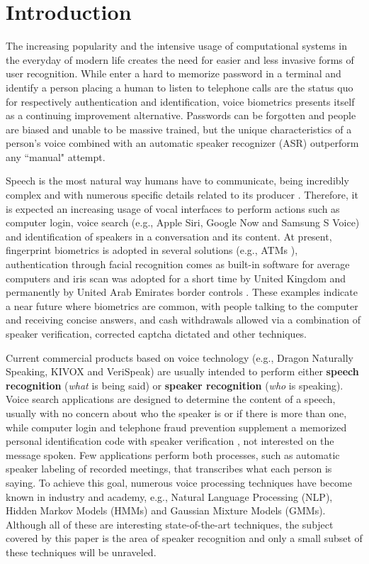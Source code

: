 \chapter{Introduction}
\label{ch:intro}

The increasing popularity and the intensive usage of computational systems in the everyday of modern life creates the need for easier and less invasive forms of user recognition. While enter a hard to memorize password in a terminal and identify a person placing a human to listen to telephone calls are the status quo for respectively authentication and identification, voice biometrics presents itself as a continuing improvement alternative. Passwords can be forgotten and people are biased and unable to be massive trained, but the unique characteristics of a person's voice combined with an automatic speaker recognizer (ASR) outperform any ``manual" attempt.

Speech is the most natural way humans have to communicate, being incredibly complex and with numerous specific details related to its producer . Therefore, it is expected an increasing usage of vocal interfaces to perform actions such as computer login, voice search (e.g., Apple Siri, Google Now and Samsung S Voice) and identification of speakers in a conversation and its content. At present, fingerprint biometrics is adopted in several solutions (e.g., ATMs ), authentication through facial recognition comes as built-in software for average computers and iris scan was adopted for a short time by United Kingdom and permanently by United Arab Emirates border controls . These examples indicate a near future where biometrics are common, with people talking to the computer and receiving concise answers, and cash withdrawals allowed via a combination of speaker verification, corrected captcha dictated and other techniques.

Current commercial products based on voice technology (e.g., Dragon Naturally Speaking, KIVOX and VeriSpeak) are usually intended to perform either \textbf{speech recognition} (\emph{what} is being said) or \textbf{speaker recognition} (\emph{who} is speaking). Voice search applications are designed to determine the content of a speech, usually with no concern about who the speaker is or if there is more than one, while computer login and telephone fraud prevention supplement a memorized personal identification code with speaker verification , not interested on the message spoken. Few applications perform both processes, such as automatic speaker labeling of recorded meetings, that transcribes what each person is saying. To achieve this goal, numerous voice processing techniques have become known in industry and academy, e.g., Natural Language Processing (NLP), Hidden Markov Models (HMMs) and Gaussian Mixture Models (GMMs). Although all of these are interesting state-of-the-art techniques, the subject covered by this paper is the area of speaker recognition and only a small subset of these techniques will be unraveled.

